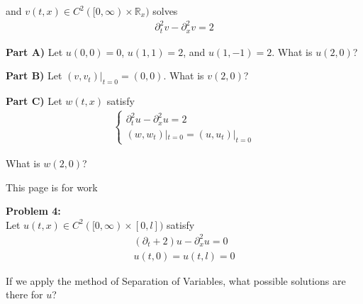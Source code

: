 \documentclass{article}
\newcommand{\R}{{\mathbb{R}}}
\newcommand{\pd}{\partial}
\begin{document}
and $v(t,x) \in C^{2}([0,\infty) \times \R_{x})$ solves 
\begin{align*}
	\pd_{t}^{2} v - \pd_{x}^{2} v = 2
\end{align*}


\textbf{Part A)} Let $ u(0,0) = 0$, $u(1,1) = 2$, and $u(1,-1) = 2$. What is $u(2,0)$?

\vspace{5 cm}


\textbf{Part B)} Let $(v,v_{t})|_{t=0} = (0,0)$. What is $v(2,0)$?


\vspace{6 cm}

\textbf{Part C)} Let $w(t,x)$ satisfy
\begin{align*}
	\begin{cases}
		\pd_{t}^{2} u - \pd_{x}^2 u = 2 \\
		(w,w_t)|_{t=0} = (u,u_t)|_{t=0}
	\end{cases}
\end{align*}

What is $w(2,0)$?

\newpage
This page is for work
\newpage

\textbf{Problem 4:} \\

Let $u(t,x) \in C^{2}([0,\infty) \times [0,l])$ satisfy 
\begin{align*}
	(\pd_{t}+2) u   - \pd_{x}^{2} u = 0 \\
	u(t,0) = u(t,l) = 0
\end{align*}

If we apply the method of Separation of Variables, what possible solutions are there for $u$?
\end{document}
